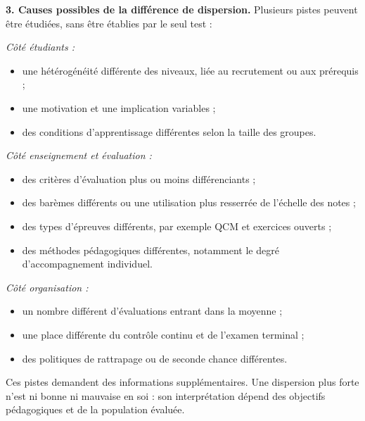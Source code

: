 {\begin{enumerate}
{\textbf{3. Causes possibles de la différence de dispersion.} Plusieurs pistes peuvent être étudiées, sans être établies par le seul test :\par\smallskip
\begin{minipage}{\linewidth}
\textit{Côté étudiants :}
\begin{itemize}
\item une hétérogénéité différente des niveaux, liée au recrutement ou aux prérequis ;
\item une motivation et une implication variables ;
\item des conditions d'apprentissage différentes selon la taille des groupes.
\end{itemize}
\end{minipage}\par
\begin{minipage}{\linewidth}
\textit{Côté enseignement et évaluation :}
\begin{itemize}
\item des critères d'évaluation plus ou moins différenciants ;
\item des barèmes différents ou une utilisation plus resserrée de l'échelle des notes ;
\item des types d'épreuves différents, par exemple QCM et exercices ouverts ;
\item des méthodes pédagogiques différentes, notamment le degré d'accompagnement individuel.
\end{itemize}
\end{minipage}\par
\begin{minipage}{\linewidth}
\textit{Côté organisation :}
\begin{itemize}
\item un nombre différent d'évaluations entrant dans la moyenne ;
\item une place différente du contrôle continu et de l'examen terminal ;
\item des politiques de rattrapage ou de seconde chance différentes.
\end{itemize}
\end{minipage}\par
Ces pistes demandent des informations supplémentaires. Une dispersion plus forte n'est ni bonne ni mauvaise en soi : son interprétation dépend des objectifs pédagogiques et de la population évaluée.
}
\end{enumerate}
}
